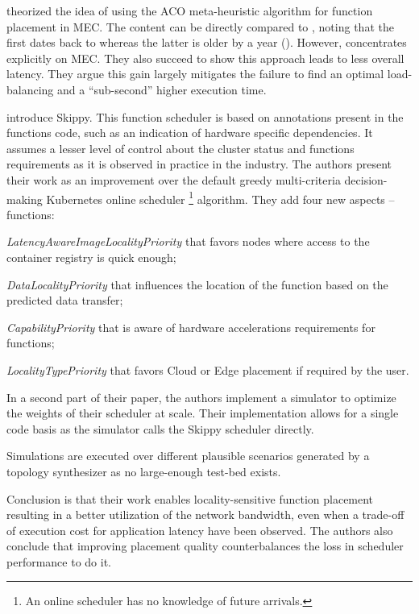 \documentclass[11pt]{sdm}
\begin{document}
\begin{description}[leftmargin=10pt]
	\item[\citet{palade_swarm-based_2020}] theorized the idea of using the \gls{ACO} meta-heuristic algorithm for function placement in \gls{MEC}. The content can be directly compared to \cite{mutichiro_qos-based_2021}, noting that the first dates back to  whereas the latter is older by a year (). However, \cite{palade_swarm-based_2020} concentrates explicitly on \gls{MEC}. They also succeed to show this approach leads to less overall latency. They argue this gain largely mitigates the failure to find an optimal load-balancing and a ``sub-second'' higher execution time.

	\item[\citet{rausch_optimized_2021}] introduce Skippy. This function scheduler is based on annotations present in the functions code, such as an indication of hardware specific dependencies. It assumes a lesser level of control about the cluster status and functions requirements as it is observed in practice in the industry. The authors present their work as an improvement over the default greedy multi-criteria decision-making Kubernetes online scheduler \footnote{An online scheduler has no knowledge of future arrivals.} algorithm. They add four new aspects -- functions:
		\begin{enumerate*}[(i)]
			\item \emph{LatencyAwareImageLocalityPriority} that favors nodes where access to the container registry is quick enough;
			\item \emph{DataLocalityPriority} that influences the location of the function based on the predicted data transfer;
			\item \emph{CapabilityPriority} that is aware of hardware accelerations requirements for functions;
			\item \emph{LocalityTypePriority} that favors Cloud or Edge placement if required by the user.
		\end{enumerate*}

		In a second part of their paper, the authors implement a simulator to optimize the weights of their scheduler at scale. Their implementation allows for a single code basis as the simulator calls the Skippy scheduler directly.

		Simulations are executed over different plausible scenarios generated by a topology synthesizer as no large-enough test-bed exists.

		Conclusion is that their work enables locality-sensitive function placement resulting in a better utilization of the network bandwidth, even when a trade-off of execution cost for application latency have been observed. The authors also conclude that improving placement quality counterbalances the loss in scheduler performance to do it.


\end{description}
\end{document}
